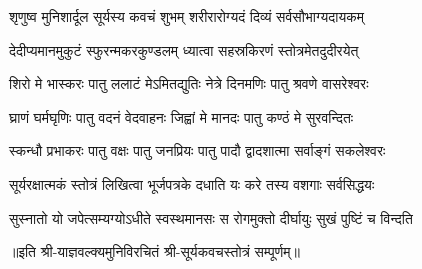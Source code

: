 


\twolineshloka
{शृणुष्व मुनिशार्दूल सूर्यस्य कवचं शुभम्}
{शरीरारोग्यदं दिव्यं सर्वसौभाग्यदायकम्}

\twolineshloka
{देदीप्यमानमुकुटं स्फुरन्मकरकुण्डलम्}
{ध्यात्वा सहस्रकिरणं स्तोत्रमेतदुदीरयेत्}

\twolineshloka
{शिरो मे भास्करः पातु ललाटं मेऽमितद्युतिः}
{नेत्रे दिनमणिः पातु श्रवणे वासरेश्वरः}

\twolineshloka
{घ्राणं घर्मघृणिः पातु वदनं वेदवाहनः}
{जिह्वां मे मानदः पातु कण्ठं मे सुरवन्दितः}

\twolineshloka
{स्कन्धौ प्रभाकरः पातु वक्षः पातु जनप्रियः}
{पातु पादौ द्वादशात्मा सर्वाङ्गं सकलेश्वरः}

\twolineshloka
{सूर्यरक्षात्मकं स्तोत्रं लिखित्वा भूर्जपत्रके}
{दधाति यः करे तस्य वशगाः सर्वसिद्धयः}

\twolineshloka
{सुस्नातो यो जपेत्सम्यग्योऽधीते स्वस्थमानसः}
{स रोगमुक्तो दीर्घायुः सुखं पुष्टिं च विन्दति}

॥इति श्री-याज्ञवल्क्यमुनिविरचितं श्री-सूर्यकवचस्तोत्रं सम्पूर्णम्॥